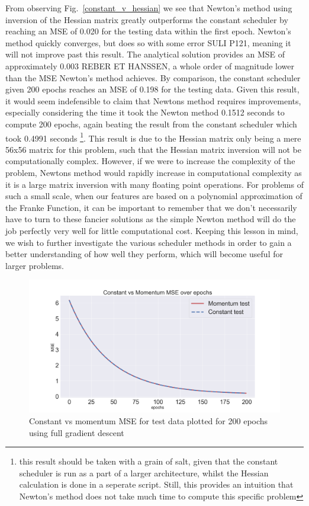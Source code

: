 \documentclass[onecolumn,10pt,cleanfoot]{asme2ej}
\begin{document}
From observing Fig.~\ref{constant_v_hessian} we see that Newton's method using inversion of the  Hessian matrix greatly outperforms the constant scheduler by reaching an MSE of 0.020 for the testing data within the first epoch. Newton's method quickly converges, but does so with some error SULI P121, meaning it will not improve past this result. The analytical solution provides an MSE of approximately 0.003 REBER ET HANSSEN, a whole order of magnitude lower than the MSE Newton's method achieves. By comparison, the constant scheduler given 200 epochs reaches an MSE of 0.198 for the testing data. Given this result, it would seem indefensible to claim that Newtons method requires improvements, especially considering the time it took the Newton method 0.1512 seconds to compute 200 epochs, again beating the result from the constant scheduler which took 0.4991 seconds \footnote{this result should be taken with a grain of salt, given that the constant scheduler is run as a part of a larger architecture, whilst the Hessian calculation is done in a seperate script. Still, this provides an intuition that Newton's method does not take much time to compute this specific problem}. This result is due to the Hessian matrix only being a mere 56x56 matrix for this problem, such that the Hessian matrix inversion will not be computationally complex. However, if we were to increase the complexity of the problem, Newtons method would rapidly increase in computational complexity as it is a large matrix inversion with many floating point operations. For problems of such a small scale, when our features are based on a polynomial approximation of the Franke Function, it can be important to remember that we don't necessarily have to turn to these fancier solutions as the simple Newton method will do the job perfectly very well for little computational cost. Keeping this lesson in mind, we wish to further investigate the various scheduler methods in order to gain a better understanding of how well they perform, which will become useful for larger problems.

\begin{figure}[h]
\centerline{\includegraphics[width=5in]{figure/constant_v_momentum.png}}
\caption{Constant vs momentum MSE for test data plotted for 200 epochs using full gradient descent}
\label{constant_v_momentum}
\end{figure}
\end{document}

